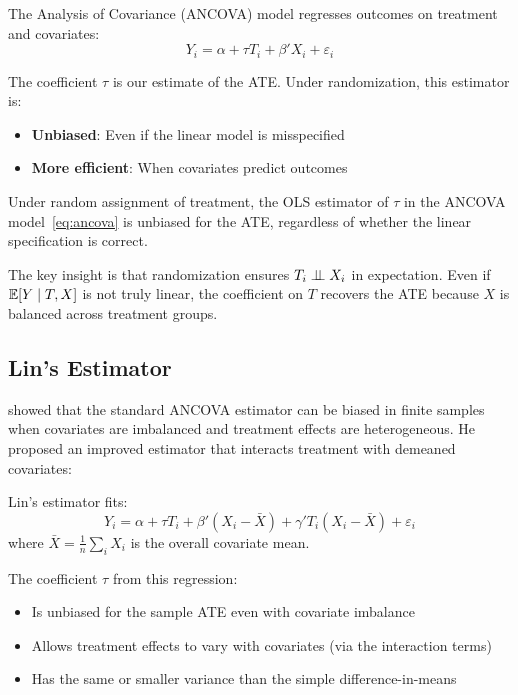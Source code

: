 The Analysis of Covariance (ANCOVA) model regresses outcomes on treatment and covariates:
\begin{equation}
Y_i = \alpha + \tau T_i + \beta' X_i + \varepsilon_i
\label{eq:ancova}
\end{equation}

The coefficient $\tau$ is our estimate of the ATE. Under randomization, this estimator is:
\begin{itemize}
    \item \textbf{Unbiased}: Even if the linear model is misspecified
    \item \textbf{More efficient}: When covariates predict outcomes
\end{itemize}

\begin{theorem}
\label{thm:ancova_unbiased}
Under random assignment of treatment, the OLS estimator of $\tau$ in the ANCOVA model~\eqref{eq:ancova} is unbiased for the ATE, regardless of whether the linear specification is correct.
\end{theorem}

The key insight is that randomization ensures $T_i \perp\!\!\!\perp X_i$ in expectation. Even if $\mathbb{E}[Y \mid T, X]$ is not truly linear, the coefficient on $T$ recovers the ATE because $X$ is balanced across treatment groups.

\subsection{Lin's Estimator}

\cite{lin2013agnostic} showed that the standard ANCOVA estimator can be biased in finite samples when covariates are imbalanced and treatment effects are heterogeneous. He proposed an improved estimator that interacts treatment with demeaned covariates:

\begin{definition}
\label{def:lin}
Lin's estimator fits:
\begin{equation}
Y_i = \alpha + \tau T_i + \beta' (X_i - \bar{X}) + \gamma' T_i (X_i - \bar{X}) + \varepsilon_i
\label{eq:lin}
\end{equation}
where $\bar{X} = \frac{1}{n} \sum_i X_i$ is the overall covariate mean.
\end{definition}

The coefficient $\tau$ from this regression:
\begin{itemize}
    \item Is unbiased for the sample ATE even with covariate imbalance
    \item Allows treatment effects to vary with covariates (via the interaction terms)
    \item Has the same or smaller variance than the simple difference-in-means
\end{itemize}

